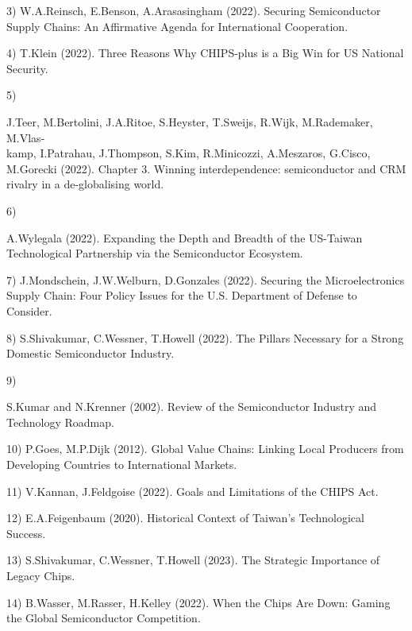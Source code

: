 \documentclass[14pt, a4paper]{extarticle}
\begin{document}
3) W.A.Reinsch, E.Benson, A.Arasasingham (2022). Securing Semiconductor Supply Chains: An Affirmative Agenda for International Cooperation.

4) T.Klein (2022). Three Reasons Why CHIPS-plus is a Big Win for US National Security.

5) \begin{english} J.Teer, M.Bertolini, J.A.Ritoe, S.Heyster, T.Sweijs, R.Wijk, M.Rademaker, M.Vlas-\\kamp, I.Patrahau, J.Thompson, S.Kim, R.Minicozzi, A.Meszaros, G.Cisco, M.Gorecki (2022). Chapter 3. Winning interdependence: semiconductor and CRM rivalry in a de-globalising world. \end{english}

6) \begin{english} A.Wylegala (2022). Expanding the Depth and Breadth of the US-Taiwan Technological Partnership via the Semiconductor Ecosystem. \end{english}

7) J.Mondschein, J.W.Welburn, D.Gonzales (2022). Securing the Microelectronics Supply Chain: Four Policy Issues for the U.S. Department of Defense to Consider.

8) S.Shivakumar, C.Wessner, T.Howell (2022). The Pillars Necessary for a Strong Domestic Semiconductor Industry.

9) \begin{english} S.Kumar and N.Krenner (2002). Review of the Semiconductor Industry and Technology Roadmap. \end{english}

10) P.Goes, M.P.Dijk (2012). Global Value Chains: Linking Local Producers from Developing Countries to International Markets.

11) V.Kannan, J.Feldgoise (2022). Goals and Limitations of the CHIPS Act.

12) E.A.Feigenbaum (2020). Historical Context of Taiwan’s Technological Success.

13) S.Shivakumar, C.Wessner, T.Howell (2023). The Strategic Importance of Legacy Chips.

14) B.Wasser, M.Rasser, H.Kelley (2022). When the Chips Are Down: Gaming the Global Semiconductor Competition.
\end{document}
